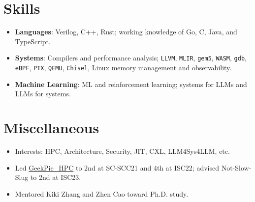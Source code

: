 \documentclass{resume}
\newcommand{\en}[1]{#1}
\newcommand{\zh}[1]{}
\begin{document}
\section{\en{Skills}\zh{技能}}
\begin{itemize}[parsep=0.25ex]
      \item \en{\textbf{Languages}: Verilog, C++, Rust; working knowledge of Go, C, Java, and TypeScript.}
            \zh{\textbf{编程语言}:
                  不局限于特定编程语言，且尤其熟悉 Verilog/C++/Rust 等，
                  了解 Golang/C/Java/TypeScript 等。}

      \item \en{\textbf{Systems}: Compilers and performance analysis; \texttt{LLVM}, \texttt{MLIR}, \texttt{gem5}, \texttt{WASM}, \texttt{gdb}, \texttt{eBPF}, \texttt{PTX}, \texttt{QEMU}, \texttt{Chisel}, Linux memory management and observability.}
            \zh{\textbf{系统}:
                  熟悉各种CPU，编译器及操作系统内核的概念与设计，熟悉各种内核性能调优工具，例如\texttt{LLVM}, \texttt{MLIR}, \texttt{Gem5}, \texttt{WASM}, \texttt{gdb}, \texttt{eBPF}, \texttt{ptx}, \texttt{qemu}, \texttt{chisel}, \texttt{Linux mm \& observability 子系统}。}

      \item \en{\textbf{Machine Learning}: ML and reinforcement learning; systems for LLMs and LLMs for systems.}
            \zh{\textbf{机器学习}:
                  熟悉经典机器与强化学习算法，对System for LLM for System有兴趣。}
\end{itemize}

\section{\en{Miscellaneous}\zh{其他}}
\begin{itemize}
      \item \en{Interests: HPC, Architecture, Security, JIT, CXL, LLM4Sys4LLM, etc.}
            \zh{兴趣：高性能计算、体系结构、安全、JIT、CXL、LLM4Sys4LLM等。}
      \item \en{Led \href{https://hpc.geekpie.club}{GeekPie\_HPC} to 2nd at SC-SCC21 and 4th at ISC22; advised Not-Slow-Slug to 2nd at ISC23.} \zh{带领\href{https://hpc.geekpie.club}{GeekPie\_HPC} SCC21 团队第2名，ISC22 团队第4名，指导 Not-Slow-Slug 团队 ISC23 团队第2名。}
      \item \en{Mentored Kiki Zhang and Zhen Cao toward Ph.D. study.}\zh{指导 Kiki Zhang, Zhen Cao 成为博士生。}
\end{itemize}
\end{document}
